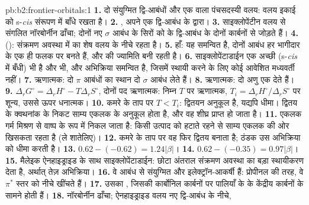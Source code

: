 \begin{solution}{pb:b2:frontier-orbitals:1}
\textbf{1.} दो संयुग्मित द्वि-आबंधों और एक  वाला पंचसदस्यी वलय: वलय
 इकाई को s-\textit{cis} संरूपण में बाँधे रखता है।
\textbf{2.} , अपने एक द्वि-आबंध के द्वारा।
\textbf{3.} साइक्लोपेंटीन वलय से संगलित नॉरबोर्नीन ढाँचा; दोनों नए $\sigma$ आबंध
 के सिरों को  के द्वि-आबंध के दोनों कार्बनों से जोड़ते हैं।
\textbf{4.}  (): संक्रमण अवस्था में  का शेष वलय
 के नीचे रहता है।
\textbf{5.} हाँ: यह समन्वित है, दोनों आबंध हर भागीदार के एक ही फलक पर बनते हैं, और
 की ज्यामिति बनी रहती है।
\textbf{6.} साइक्लोपेंटाडाईन एक अच्छी  (s-\textit{cis} में बँधी) भी है और  भी, और
अभिक्रिया समन्वित है, जिसमें स्थायी करने के लिए कोई आवेशित मध्यवर्ती नहीं।
\textbf{7.} ऋणात्मक: दो $\pi$ आबंधों का स्थान दो $\sigma$ आबंध लेते हैं।
\textbf{8.} ऋणात्मक: दो अणु एक देते हैं।
\textbf{9.} $\Delta_r G^\circ = \Delta_r H^\circ - T\Delta_r S^\circ$, दोनों पद ऋणात्मक: निम्न
$T$ पर ऋणात्मक, $T_i = \Delta_r H^\circ/\Delta_r S^\circ$ पर शून्य, उससे ऊपर धनात्मक।
\textbf{10.} कमरे के ताप पर $T < T_i$: द्वितयन अनुकूल है, यद्यपि धीमा। द्वितय के
क्वथनांक के निकट साम्य एकलक के अनुकूल होता है, और वह शीघ्र
प्राप्त हो जाता है।
\textbf{11.} एकलक गर्म मिश्रण से वाष्प के रूप में निकल जाता है: किसी उत्पाद को हटाते रहने से
साम्य एकलक की ओर खिसकता रहता है (ले शातेलिए)।
\textbf{12.} कमरे के ताप पर वह फिर द्वितय बनाता है; ठंडक उस अभिक्रिया को धीमा करती है।
\textbf{13.} $0.62 - (-0.62) = 1.24|\beta|$।
\textbf{14.} $0.62 - (-0.35) = 0.97|\beta|$।
\textbf{15.} मैलेइक ऐनहाइड्राइड के साथ साइक्लोपेंटाडाईन: छोटा अंतराल संक्रमण अवस्था का
बड़ा स्थायीकरण देता है, अर्थात् तेज़ अभिक्रिया।
\textbf{16.} वे  आबंध से संयुग्मित और इलेक्ट्रॉन-आकर्षी हैं: प्रोपीनल की तरह,
वे $\pi^*$ स्तर को नीचे खींचते हैं।
\textbf{17.} उसका , जिसकी कार्बोनिल कार्बनों पर पालियाँ  के  के
केंद्रीय कार्बनों के सामने होती हैं।
\textbf{18.} नॉरबोर्नीन ढाँचा; ऐनहाइड्राइड वलय नए द्वि-आबंध के नीचे,

\end{solution}
